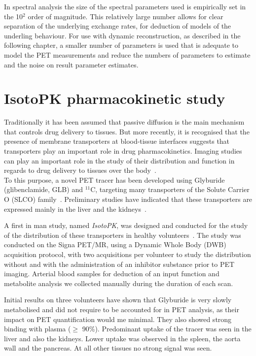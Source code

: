 In spectral analysis the size of the spectral parameters used is empirically set in the 10$^2$ order of magnitude. This relatively large number allows for clear separation of the underlying exchange rates, for deduction of models of the underling behaviour. 
For use with dynamic reconstruction, as described in the following chapter, a smaller number of parameters is used that is adequate to model the PET measurements and reduce the numbers of parameters to estimate and the noise on result parameter estimates. 

\section{IsotoPK pharmacokinetic study}

Traditionally it has been assumed that passive diffusion is the main mechanism that controls drug delivery to tissues. 
But more recently, it is recognised that the presence of membrane transporters at blood-tissue interfaces suggests that transporters play an important role in drug pharmacokinetics. Imaging studies can play an important role in the study of their distribution and function in regards to drug delivery to tissues over the body~\cite{Marie2017}. \\

To this purpose, a novel PET tracer has been developed using Glyburide (glibenclamide, GLB) and $^{11}$C, targeting many transporters of the Solute Carrier O (SLCO) family~\cite{Tournier2013,Caille2020}. Preliminary studies have indicated that these transporters are expressed mainly in the liver and the kidneys~\cite{Tournier2013}.

A first in man study, named \textit{IsotoPK}, was designed and conducted for the study of the distribution of these transporters in healthy volunteers~\cite{Marie2019}.
The study was conducted on the Signa PET/MR, using a Dynamic Whole Body (DWB) acquisition protocol, with two acquisitions per volunteer to study the distribution without and with the administration of an inhibitor substance prior to PET imaging.
Arterial blood samples for deduction of an input function and metabolite analysis we collected manually during the duration of each scan. 

Initial results on three volunteers have shown that Glyburide is very slowly metabolised and did not require to be accounted for in PET analysis, as their impact on PET quantification would me minimal. They also showed strong binding with plasma ($\geq$ 90\%).
Predominant uptake of the tracer was seen in the liver and also the kidneys. Lower uptake was observed in the spleen, the aorta wall and the pancreas. At all other tissues no strong signal was seen.  

